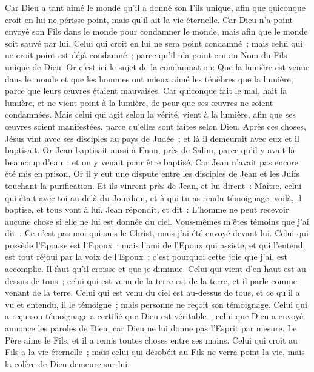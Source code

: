 \begin{multicols}{2}
Car Dieu a tant aimé le monde qu'il a donné son Fils unique, afin que quiconque croit en lui ne périsse point, mais qu'il ait la vie éternelle.
Car Dieu n'a point envoyé son Fils dans le monde pour condamner le monde, mais afin que le monde soit sauvé par lui.
Celui qui croit en lui ne sera point condamné~; mais celui qui ne croit point est déjà condamné~; parce qu'il n'a point cru au Nom du Fils unique de Dieu.
Or c'est ici le sujet de la condamnation: Que la lumière est venue dans le monde et que les hommes ont mieux aimé les ténèbres que la lumière, parce que leurs œuvres étaient mauvaises.
Car quiconque fait le mal, hait la lumière, et ne vient point à la lumière, de peur que ses œuvres ne soient condamnées.
Mais celui qui agit selon la vérité, vient à la lumière, afin que ses œuvres soient manifestées, parce qu'elles sont faites selon Dieu.
Après ces choses, Jésus vint avec ses disciples au pays de Judée~; et là il demeurait avec eux et il baptisait.
Or Jean baptisait aussi à Enon, près de Salim, parce qu'il y avait là beaucoup d'eau~; et on y venait pour être baptisé.
Car Jean n'avait pas encore été mis en prison.
Or il y eut une dispute entre les disciples de Jean et les Juifs touchant la purification.
Et ils vinrent près de Jean, et lui dirent~: Maître, celui qui était avec toi au-delà du Jourdain, et à qui tu as rendu témoignage, voilà, il baptise, et tous vont à lui.
Jean répondit, et dit~: L'homme ne peut recevoir aucune chose si elle ne lui est donnée du ciel.
Vous-mêmes m'êtes témoins que j'ai dit~: Ce n'est pas moi qui suis le Christ, mais j'ai été envoyé devant lui.
Celui qui possède l'Epouse est l'Epoux~; mais l'ami de l'Epoux qui assiste, et qui l'entend, est tout réjoui par la voix de l'Epoux~; c'est pourquoi cette joie que j'ai, est accomplie.
Il faut qu'il croisse et que je diminue.
Celui qui vient d'en haut est au-dessus de tous~; celui qui est venu de la terre est de la terre, et il parle comme venant de la terre. Celui qui est venu du ciel est au-dessus de tous,
et ce qu'il a vu et entendu, il le témoigne~; mais personne ne reçoit son témoignage.
Celui qui a reçu son témoignage a certifié que Dieu est véritable~;
celui que Dieu a envoyé annonce les paroles de Dieu, car Dieu ne lui donne pas l'Esprit par mesure.
Le Père aime le Fils, et il a remis toutes choses entre ses mains.
Celui qui croit au Fils a la vie éternelle~; mais celui qui désobéit au Fils ne verra point la vie, mais la colère de Dieu demeure sur lui.

\end{multicols}
